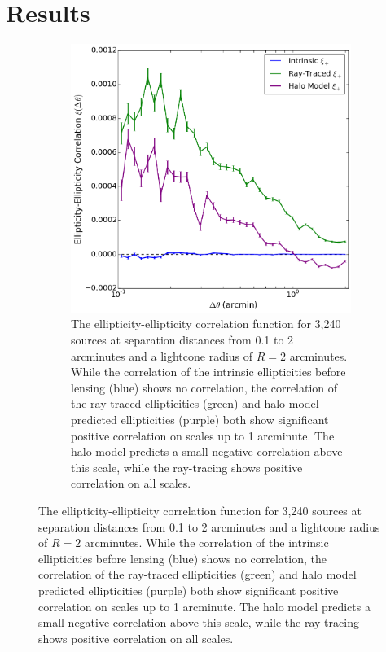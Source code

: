 \documentclass[%
 reprint,
 amsmath,amssymb,
 aps,nofootinbib
]{revtex4-1}
\begin{document}
\section{Results}

\begin{figure}
    \centering
    \begin{subfigure}{0.475\textwidth}
        \includegraphics[width=\textwidth]{figs-swe/gg_corr.png}
        \captionsetup{justification=raggedright,singlelinecheck=false}
        \caption{The ellipticity-ellipticity correlation function for 3,240 sources at separation distances from 0.1 to 2 arcminutes and a lightcone radius of $R=2$ arcminutes. While the correlation of the intrinsic ellipticities before lensing (blue) shows no correlation, the correlation of the ray-traced ellipticities (green) and halo model predicted ellipticities (purple) both show significant positive correlation on scales up to 1 arcminute. The halo model predicts a small negative correlation above this scale, while the ray-tracing shows positive correlation on all scales.}

\end{subfigure}
\end{figure}
\end{document}
